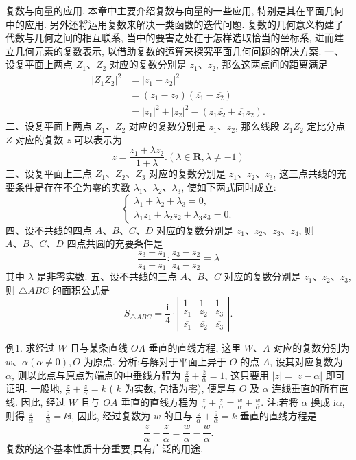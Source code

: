 
复数与向量的应用.
本章中主要介绍复数与向量的一些应用, 特别是其在平面几何中的应用.
另外还将运用复数来解决一类函数的迭代问题.
复数的几何意义构建了代数与几何之间的相互联系, 当中的要害之处在于怎样选取恰当的坐标系, 进而建立几何元素的复数表示, 以借助复数的运算来探究平面几何问题的解决方案.
一、设复平面上两点 $Z_1 、 Z_2$ 对应的复数分别是 $z_1 、 z_2$, 那么这两点间的距离满足
$$
\begin{aligned}
\left|Z_1 Z_2\right|^2 & =\left|z_1-z_2\right|^2 \\
& =\left(z_1-z_2\right)\left(\overline{z_1}-\overline{z_2}\right) \\
& =\left|z_1\right|^2+\left|z_2\right|^2-\left(z_1 \overline{z_2}+\overline{z_1} z_2\right) .
\end{aligned}
$$
二、设复平面上两点 $Z_1 、 Z_2$ 对应的复数分别是 $z_1 、 z_2$, 那么线段 $Z_1 Z_2$ 定比分点 $Z$ 对应的复数 $z$ 可以表示为
$$
z=\frac{z_1+\lambda z_2}{1+\lambda} .(\lambda \in \mathbf{R}, \lambda \neq-1)
$$
三、设复平面上三点 $Z_1 、 Z_2 、 Z_3$ 对应的复数分别是 $z_1 、 z_2 、 z_3$, 这三点共线的充要条件是存在不全为零的实数 $\lambda_1 、 \lambda_2 、 \lambda_3$, 使如下两式同时成立:
$$
\left\{\begin{array}{l}
\lambda_1+\lambda_2+\lambda_3=0, \\
\lambda_1 z_1+\lambda_2 z_2+\lambda_3 z_3=0 .
\end{array}\right.
$$
四、设不共线的四点 $A 、 B 、 C 、 D$ 对应的复数分别是 $z_1 、 z_2 、 z_3 、 z_4$, 则 $A 、 B 、 C 、 D$ 四点共圆的充要条件是
$$
\frac{z_3-z_1}{z_4-z_1}: \frac{z_3-z_2}{z_4-z_2}=\lambda
$$
其中 $\lambda$ 是非零实数.
五、设不共线的三点 $A 、 B 、 C$ 对应的复数分别是 $z_1 、 z_2 、 z_3$, 则 $\triangle A B C$
的面积公式是
$$
S_{\triangle A B C}=\frac{\mathrm{i}}{4} \cdot\left|\begin{array}{ccc}
1 & 1 & 1 \\
z_1 & z_2 & z_3 \\
\overline{z_1} & \overline{z_2} & \overline{z_3}
\end{array}\right| .
$$



例1. 求经过 $W$ 且与某条直线 $O A$ 垂直的直线方程, 这里 $W 、 A$ 对应的复数分别为 $w 、 \alpha(\alpha \neq 0), O$ 为原点.
分析:与解对于平面上异于 $O$ 的点 $A$, 设其对应复数为 $\alpha$, 则以此点与原点为端点的中垂线方程为 $\frac{z}{\alpha}+\frac{\bar{z}}{\bar{\alpha}}=1$, 这只要用 $|z|=|z-\alpha|$ 即可证明.
一般地, $\frac{z}{\alpha}+\frac{\bar{z}}{\bar{\alpha}}=k$ ( $k$ 为实数, 包括为零), 便是与 $O$ 及 $\alpha$ 连线垂直的所有直线.
因此, 经过 $W$ 且与 $O A$ 垂直的直线方程为 $\frac{z}{\alpha}+\frac{\bar{z}}{\bar{\alpha}}=\frac{w}{\alpha}+\frac{\bar{w}}{\bar{\alpha}}$.
注:若将 $\alpha$ 换成 $\mathrm{i} \alpha$, 则得 $\frac{z}{\alpha}-\frac{\bar{z}}{\bar{\alpha}}=k \mathrm{i}$, 因此, 经过复数为 $w$ 的且与 $\frac{z}{\alpha}+ \frac{\bar{z}}{\bar{\alpha}}=k$ 垂直的直线方程是
$$
\frac{z}{\alpha}-\frac{\bar{z}}{\bar{\alpha}}=\frac{w}{\alpha}-\frac{\bar{w}}{\bar{\alpha}} .
$$
复数的这个基本性质十分重要,具有广泛的用途.



